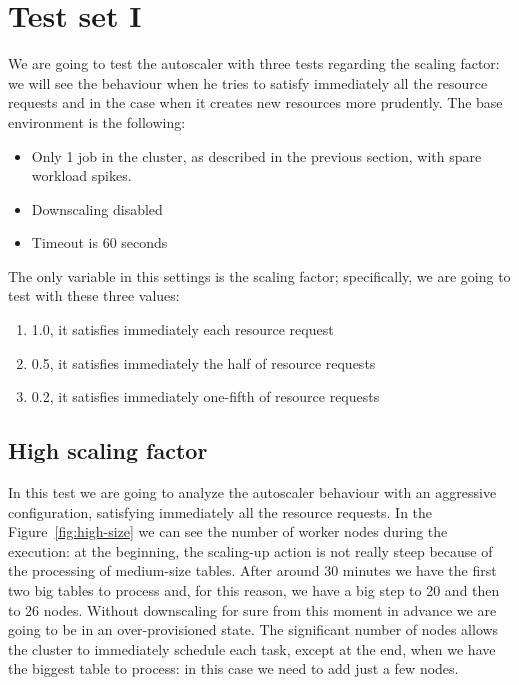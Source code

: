 \documentclass[12pt,twoside,cucitura]{toptesi}
\begin{document}
\section{Test set I}
We are going to test the autoscaler with three tests regarding the scaling factor: we will see the behaviour when he tries to satisfy immediately all the resource requests and in the case when it creates new resources more prudently. The base environment is the following:
\begin{itemize}
	\item Only 1 job in the cluster, as described in the previous section, with spare workload spikes.
	\item Downscaling disabled
	\item Timeout is 60 seconds
\end{itemize}
The only variable in this settings is the scaling factor; specifically, we are going to test with these three values:
\begin{enumerate}
	\item 1.0, it satisfies immediately each resource request
	\item 0.5, it satisfies immediately the half of resource requests
	\item 0.2, it satisfies immediately one-fifth of resource requests
\end{enumerate}

\subsection{High scaling factor}
In this test we are going to analyze the autoscaler behaviour with an aggressive configuration, satisfying immediately all the resource requests. In the Figure~\ref{fig:high-size} we can see the number of worker nodes during the execution: at the beginning, the scaling-up action is not really steep because of the processing of medium-size tables. After around 30 minutes we have the first two big tables to process and, for this reason, we have a big step to 20 and then to 26 nodes. Without downscaling for sure from this moment in advance we are going to be in an over-provisioned state. The significant number of nodes allows the cluster to immediately schedule each task, except at the end, when we have the biggest table to process: in this case we need to add just a few nodes.
\end{document}

